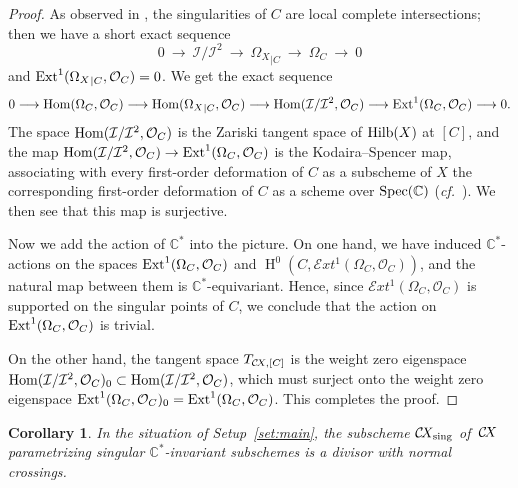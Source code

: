 \documentclass[10pt,a4paper]{article}
\numberwithin{equation}{section}
\newtheorem{corollary}[theorem]{Corollary}
\theoremstyle{definition}
\theoremstyle{remark}
\DeclareMathOperator{\Spec}{Spec}
\DeclareMathOperator{\HH}{H}
\def\sing{\operatorname{sing}}
\def\C{{\mathbb C}}
\def\cI{{\mathcal I}}
\def\cO{{\mathcal{O}}}
\def\cExt{{\mathcal E}xt}
\def\operatorname#1{\mathop{\rm #1}\nolimits}
\def\Ext{\operatorname{Ext}}
\def\Hilb{\operatorname{Hilb}}
\def\Hom{\operatorname{Hom}}
\def\Hom{\operatorname{Hom}}
\def\Spec{\operatorname{Spec}}
\def\CX{\mathcal{C}\!X\hspace{-0.5pt}}
\newcommand{\shse}[3]{0 ~\lra ~#1~ \lra ~#2~ \lra ~#3~ \lra~ 0}
\newcommand\lra{\longrightarrow}
\begin{document}
\begin{proof}
As observed in \cite[Proof of Proposition 6.4]{WORS6}, the singularities of $C$ are local complete intersections; then we have a short exact sequence
\begin{equation}\label{eq:ses1}
\shse{\cI/\cI^2}{{\Omega_X}_{|C}}{\Omega_C}
\end{equation}
and  $\Ext^1({\Omega_X}_{|C},\cO_C)=0$. 
We get the exact sequence 
\begin{multline}\label{eq:FP}
0\lra\Hom(\Omega_C,\cO_C)\lra\Hom({\Omega_X}_{|C},\cO_C)\lra \Hom(\cI/\cI^2,\cO_C)\lra \Ext^1(\Omega_C,\cO_C)\lra 0.
\end{multline}
The space $\Hom(\cI/\cI^2,\cO_C)$ is the Zariski tangent space of $\Hilb(X)$ at $[C]$, and the map $\Hom(\cI/\cI^2,\cO_C)\to \Ext^1(\Omega_C,\cO_C)$ is the Kodaira--Spencer map, associating  with every first-order deformation of $C$ as a subscheme of $X$ the corresponding first-order deformation of $C$ as a scheme over $\Spec(\C)$ (\textit{cf.}~\cite[Remark 2.4.4]{Ser1}). We then see that this map is surjective. 

Now we add the action of $\C^*$ into the picture. On one hand, we have induced $\C^*$-actions on the  spaces $\Ext^1(\Omega_C,\cO_C)$ and $\HH^0(C,\cExt^1(\Omega_C,\cO_C))$, and the natural map between them is $\C^*$-equivariant. Hence, since $\cExt^1(\Omega_C,\cO_C)$ is supported on the singular points of $C$, we conclude that the action on $\Ext^1(\Omega_C,\cO_C)$ is trivial.

 On the other hand, the tangent space $T_{\CX,[C]}$ is the weight zero eigenspace  $\Hom(\cI/\cI^2,\cO_C)_0\subset \Hom(\cI/\cI^2,\cO_C)$, which must surject onto the weight zero eigenspace $\Ext^1(\Omega_C,\cO_C)_0=\Ext^1(\Omega_C,\cO_C)$. This completes the proof.
\end{proof}

\begin{corollary}\label{cor:kodspen}
In the situation of Setup~\ref{set:main}, the subscheme $\CX_{\sing}$ of\, $\CX$ parametrizing singular $\C^*$-invariant subschemes is a divisor with normal crossings.
\end{corollary}
\end{document}
